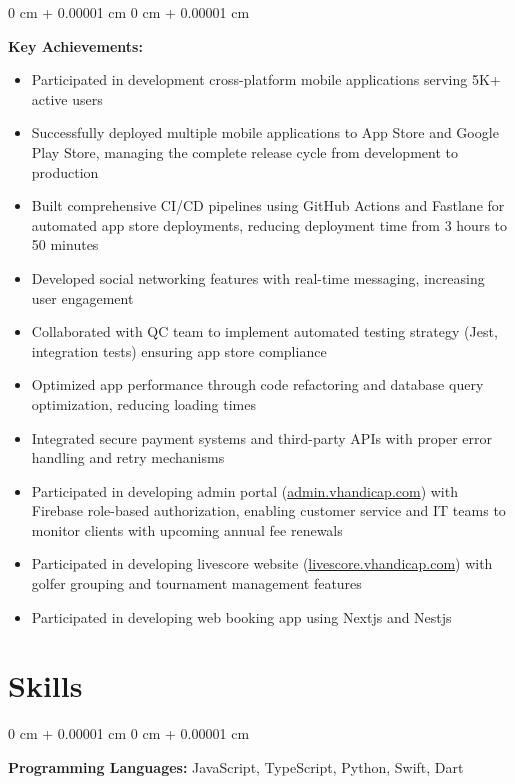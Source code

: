 \documentclass[10pt, letterpaper]{article}
\newenvironment{highlights}{
    \begin{itemize}[
        topsep=0.10 cm,
        parsep=0.10 cm,
        partopsep=0pt,
        itemsep=0pt,
        leftmargin=0 cm + 10pt
    ]
}{
    \end{itemize}
} %
\newenvironment{onecolentry}{
    \begin{adjustwidth}{
        0 cm + 0.00001 cm
    }{
        0 cm + 0.00001 cm
    }
}{
    \end{adjustwidth}
} %
\begin{document}
        \vspace{0.15 cm}
        \begin{onecolentry}
            \textbf{Key Achievements:}
            \begin{highlights}
                \item Participated in development cross-platform mobile applications serving 5K+ active users
                \item Successfully deployed multiple mobile applications to App Store and Google Play Store, managing the complete release cycle from development to production
                \item Built comprehensive CI/CD pipelines using GitHub Actions and Fastlane for automated app store deployments, reducing deployment time from 3 hours to 50 minutes
                \item Developed social networking features with real-time messaging, increasing user engagement
                \item Collaborated with QC team to implement automated testing strategy (Jest, integration tests) ensuring app store compliance
                \item Optimized app performance through code refactoring and database query optimization, reducing loading times
                \item Integrated secure payment systems and third-party APIs with proper error handling and retry mechanisms
                \item Participated in developing admin portal (\href{https://admin.vhandicap.com}{admin.vhandicap.com}) with Firebase role-based authorization, enabling customer service and IT teams to monitor clients with upcoming annual fee renewals
                \item Participated in developing livescore website (\href{https://livescore.vhandicap.com}{livescore.vhandicap.com}) with golfer grouping and tournament management features
                \item Participated in developing web booking app using Nextjs and Nestjs
            \end{highlights}
        \end{onecolentry}

    \section{Skills}

        \begin{onecolentry}
            \textbf{Programming Languages:} JavaScript, TypeScript, Python, Swift, Dart
        \end{onecolentry}
\end{document}
